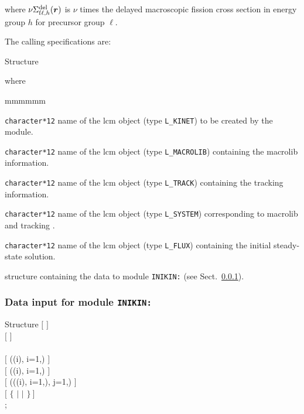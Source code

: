 \noindent where $\nu\Sigma_{{\rm f}\ell,h}^{\rm del}(\bff(r))$ is $\nu$ times the delayed macroscopic fission cross section in energy group
$h$ for precursor group $\ell$.

The calling specifications are:

\begin{DataStructure}{Structure }
 \moc{:=}      \moc{::} 
\end{DataStructure}

\noindent where
\begin{ListeDeDescription}{mmmmmm}

\item[\dusa{KINET}] {\tt character*12} name of the {\sc lcm} object (type {\tt L\_KINET}) to be created by the module.

\item[\dusa{MACRO}] {\tt character*12} name of the {\sc lcm} object (type {\tt L\_MACROLIB}) containing the {\sc macrolib} information.

\item[\dusa{TRACK}] {\tt character*12} name of the {\sc lcm} object (type {\tt L\_TRACK}) containing the {\sc tracking} information.

\item[\dusa{SYST}] {\tt character*12} name of the {\sc lcm} object (type {\tt L\_SYSTEM}) corresponding to {\sc macrolib} 
and {\sc tracking} .

\item[\dusa{FLUX}] {\tt character*12} name of the {\sc lcm} object (type {\tt L\_FLUX}) containing the initial steady-state solution.

\item[\dstr{inikin\_data}] structure containing the data to module {\tt INIKIN:} (see Sect.~\ref{sect:inikin_data}).

\end{ListeDeDescription}

\vskip 0.2cm

\subsubsection{Data input for module {\tt INIKIN:}}\label{sect:inikin_data}

\begin{DataStructure}{Structure }
$[$   $]$ \\
$[$   $]$ \\
~  \\
$[$  ((i),    i=1,) $]$ \\
$[$  ((i),    i=1,) $]$ \\
$[$  (((i),    i=1,), j=1,) $]$ \\
$[$  $\{$  $|$  $|$   $\}~]$ \\
;
\end{DataStructure}

